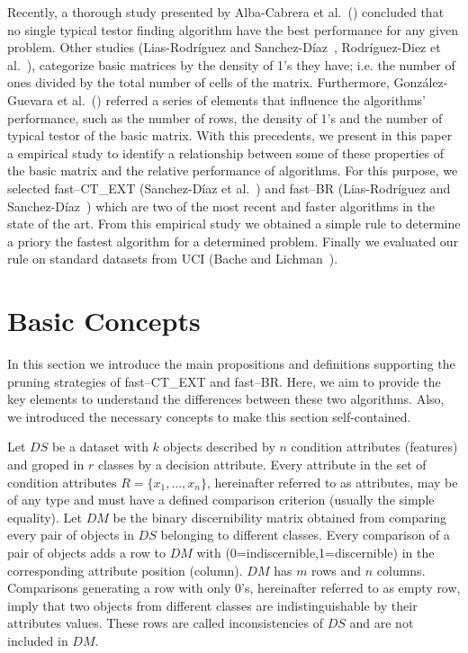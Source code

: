 \documentclass[citeauthoryear]{llncs}
\begin{document}
	Recently, a thorough study presented by Alba-Cabrera et al.~(\cite{Alba13}) concluded that no single typical testor finding algorithm have the best performance for any given problem. Other studies (Lias-Rodr\'iguez and Sanchez-D\'iaz~\cite{Lias2013}, Rodríguez-Diez et al.~\cite{Rodriguez15}), categorize basic matrices by the density of 1's they have; i.e. the number of ones divided by the total number of cells of the matrix. Furthermore, González-Guevara et al.~(\cite{Gonzalez15}) referred a series of elements that influence the algorithms' performance, such as the number of rows, the density of 1's and the number of typical testor of the basic matrix. With this precedents, we present in this paper a empirical study to identify a relationship between some of these properties of the basic matrix and the relative performance of algorithms. For this purpose, we selected fast--CT\_EXT (Sanchez-D\'iaz et al.~\cite{Sanchez2010}) and fast--BR (Lias-Rodr\'iguez and Sanchez-D\'iaz~\cite{Lias2013}) which are two of the most recent and faster algorithms in the state of the art. From this empirical study we obtained a simple rule to determine a priory the fastest algorithm for a determined problem. Finally we evaluated our rule on standard datasets from UCI (Bache and Lichman~\cite{Bache13}). 
	
%
\section{Basic Concepts}
%
	In this section we introduce the main propositions and definitions supporting the pruning strategies of fast--CT\_EXT and fast--BR. Here, we aim to provide the key elements to understand the differences between these two algorithms. Also, we introduced the necessary concepts to make this section self-contained.	
	
	Let $DS$ be a dataset with $k$ objects described by $n$ condition attributes (features) and groped in $r$ classes by a decision attribute. Every attribute in the set of condition attributes $R=\lbrace x_1,...,x_n \rbrace$, hereinafter referred to as attributes, may be of any type and must have a defined comparison criterion (usually the simple equality). Let $DM$ be the binary discernibility matrix obtained from comparing every pair of objects in $DS$ belonging to different classes. Every comparison of a pair of objects adds a row to $DM$ with (0=indiscernible,1=discernible) in the corresponding attribute position (column). $DM$ has $m$ rows and $n$ columns. Comparisons generating a row with only 0's, hereinafter referred to as empty row, imply that two objects from different classes are indistinguishable by their attributes values. These rows are called inconsistencies of $DS$ and are not included in $DM$.
	
\end{document}
